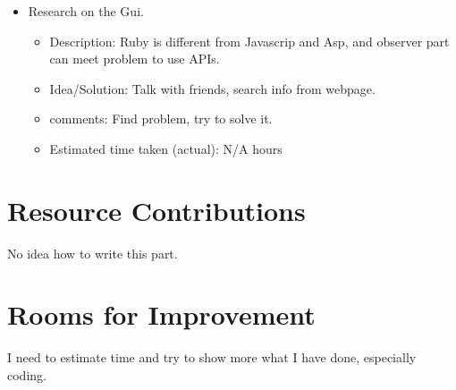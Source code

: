 \begin{itemize}
	\item Research on the Gui. 
	      \begin{itemize}
	         \item Description: Ruby is different from Javascrip and Asp, and observer part can meet problem to use APIs.
	         \item Idea/Solution: Talk with friends, search info from webpage.
	         \item comments: Find problem, try to solve it.
	         \item Estimated time taken (actual): N/A hours
	     \end{itemize}
\end{itemize}

\section*{Resource Contributions}

No idea how to write this part.

\section*{Rooms for Improvement}

I need to estimate time and try to show more what I have done, especially coding.
